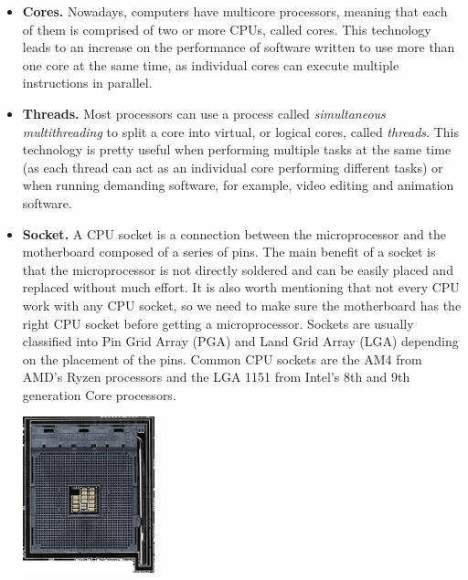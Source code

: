 \documentclass[a4paper, twoside, 11pt]{article}
\begin{document}
{\begin{itemize}
        The most common microprocessor architecture today is x86, which is implemented in both 32-bit and 64-bits (x86-64) microprocessors. Most of the 64-bit microprocessors today are x86-64 CISC, but there are still 64-bit RISC microprocessors that uses other architectures, such as ARM.

    \item\textbf{Cores.} Nowadays, computers have multicore processors, meaning that each of them is comprised of two or more CPUs, called cores. This technology leads to an increase on the performance of software written to use more than one core at the same time, as individual cores can execute multiple instructions in parallel. 

    \item\textbf{Threads.} Most processors can use a process called \textit{simultaneous multithreading} to split a core into virtual, or logical cores, called \textit{threads}. This technology is pretty useful when performing multiple tasks at the same time (as each thread can act as an individual core performing different tasks) or when running demanding software, for example, video editing and animation software.
    \item\textbf{Socket.} A CPU socket is a connection between the microprocessor and the motherboard composed of a series of pins. The main benefit of a socket is that the microprocessor is not directly soldered and can be easily placed and replaced without much effort. It is also worth mentioning that not every CPU work with any CPU socket, so we need to make sure the motherboard has the right CPU socket before getting a microprocessor. Sockets are usually classified into Pin Grid Array (PGA) and Land Grid Array (LGA) depending on the placement of the pins. Common CPU sockets are the AM4 from AMD's Ryzen processors and the LGA 1151 from Intel's 8th and 9th generation Core processors.
    \begin{center}
        \includegraphics[width=0.3\textwidth]{./figures/am4-socket.png}
    \end{center}


\end{itemize}}
\end{document}
